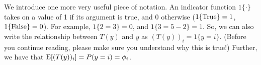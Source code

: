 \documentclass{article}
\begin{document}
We introduce one more very useful piece of notation.  An indicator function $1\{\cdot\}$
takes on a value of 1 if its argument is true, and 0 otherwise
($1\{{\rm True}\}=1$, $1\{{\rm False}\}=0$).  For example, $1\{2=3\}=0$,
and $1\{3=5-2\}=1$.  So, we can also write the relationship between
$T(y)$ and $y$ as $(T(y))_i = 1\{y=i\}$.  (Before you continue reading,
please make sure you understand why this is true!)  Further, we
have that ${\rm E}[(T(y))_i] = P(y=i) = \phi_i$.

\end{document}
